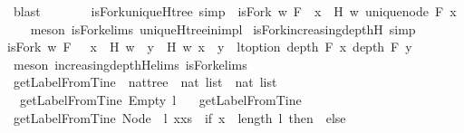 \begin{isabellebody}
\ blast%
\endisatagproof
{\isafoldproof}%
%
\isadelimproof
\ \isanewline
%
\endisadelimproof
\ \ \ \ \isanewline
{}\isamarkupfalse%
\ isFork{\isacharunderscore}uniqueH{\isacharunderscore}tree\ {\isacharbrackleft}simp{\isacharbrackright}\ {\isacharcolon}\ {\isachardoublequoteopen}isFork\ w\ F\ {\isasymlongrightarrow}\ {\isacharparenleft}{\isasymforall}x\ {\isasymin}\ H\ w{\isachardot}\ unique{\isacharunderscore}node\ F\ x{\isacharparenright}{\isachardoublequoteclose}\isanewline
%
\isadelimproof
\ \ %
\endisadelimproof
%
\isatagproof
{}\isamarkupfalse%
\ {\isacharparenleft}meson\ isFork{\isachardot}elims{\isacharparenleft}{}{\isacharparenright}\ uniqueH{\isacharunderscore}tree{\isacharunderscore}in{\isacharunderscore}imp{\isacharunderscore}l{\isacharparenright}%
\endisatagproof
{\isafoldproof}%
%
\isadelimproof
\isanewline
%
\endisadelimproof
\isanewline
{}\isamarkupfalse%
\ isFork{\isacharunderscore}increasing{\isacharunderscore}depth{\isacharunderscore}H\ {\isacharbrackleft}simp{\isacharbrackright}\ {\isacharcolon}\ \isanewline
{\isachardoublequoteopen}isFork\ w\ F\ {\isasymlongrightarrow}\ {\isacharparenleft}{\isasymforall}\ x\ {\isasymin}\ H\ w{\isachardot}\ {\isasymforall}\ y\ {\isasymin}\ H\ w{\isachardot}\ x\ {\isacharless}\ y\ {\isasymlongrightarrow}\ lt{\isacharunderscore}option\ {\isacharparenleft}depth\ F\ x{\isacharparenright}\ {\isacharparenleft}depth\ F\ y{\isacharparenright}{\isacharparenright}{\isachardoublequoteclose}\isanewline
%
\isadelimproof
\ \ %
\endisadelimproof
%
\isatagproof
{}\isamarkupfalse%
\ {\isacharparenleft}meson\ increasing{\isacharunderscore}depth{\isacharunderscore}H{\isachardot}elims{\isacharparenleft}{}{\isacharparenright}\ isFork{\isachardot}elims{\isacharparenleft}{}{\isacharparenright}{\isacharparenright}%
\endisatagproof
{\isafoldproof}%
%
\isadelimproof
\ \ \isanewline
%
\endisadelimproof
\ \ \isanewline
{}\isamarkupfalse%
\ getLabelFromTine\ {\isacharcolon}{\isacharcolon}\ {\isachardoublequoteopen}nattree\ {\isasymRightarrow}\ nat\ list\ {\isasymRightarrow}\ nat\ list{\isachardoublequoteclose}\ \ \isanewline
\ \ {\isachardoublequoteopen}getLabelFromTine\ Empty\ l\ {\isacharequal}\ {\isacharbrackleft}{\isacharbrackright}{\isachardoublequoteclose}\isanewline
{\isacharbar}\ {\isachardoublequoteopen}getLabelFromTine\ {\isacharunderscore}\ {\isacharbrackleft}{\isacharbrackright}\ {\isacharequal}\ {\isacharbrackleft}{\isacharbrackright}{\isachardoublequoteclose}\isanewline
{\isacharbar}\ {\isachardoublequoteopen}getLabelFromTine\ {\isacharparenleft}Node\ {\isacharunderscore}\ l{\isacharparenright}\ {\isacharparenleft}x{\isacharhash}xs{\isacharparenright}\ {\isacharequal}\ {\isacharparenleft}if\ x\ {\isasymge}\ length\ l\ then\ {\isacharbrackleft}{\isacharbrackright}\ else\ \isanewline

\end{isabellebody}
